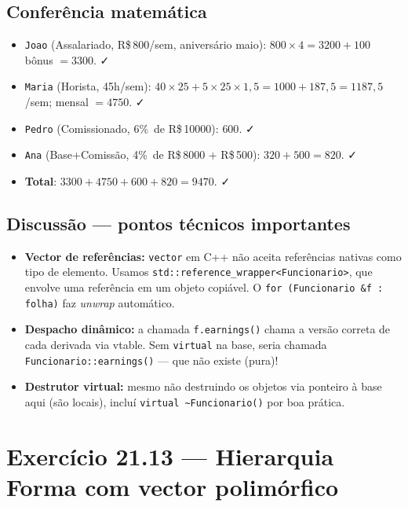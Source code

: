 \documentclass[11pt,a4paper]{article}
\begin{document}
\subsection*{Confer\^encia matem\'atica}

\begin{itemize}[leftmargin=*,itemsep=0pt]
  \item \texttt{Joao} (Assalariado, R\$\,800/sem, anivers\'ario maio): $800 \times 4 = 3200 + 100$ b\^onus $= 3300$. ✓
  \item \texttt{Maria} (Horista, 45h/sem): $40 \times 25 + 5 \times 25 \times 1{,}5 = 1000 + 187{,}5 = 1187{,}5$/sem; mensal $= 4750$. ✓
  \item \texttt{Pedro} (Comissionado, 6\%\ de R\$\,10000): $600$. ✓
  \item \texttt{Ana} (Base+Comiss\~ao, 4\%\ de R\$\,8000 + R\$\,500): $320 + 500 = 820$. ✓
  \item \textbf{Total}: $3300 + 4750 + 600 + 820 = 9470$. ✓
\end{itemize}

\subsection*{Discuss\~ao --- pontos t\'ecnicos importantes}

\begin{itemize}[leftmargin=*]
  \item \textbf{Vector de refer\^encias:} \texttt{vector} em C++ n\~ao aceita refer\^encias nativas como tipo de elemento. Usamos \texttt{std::reference\_wrapper<Funcionario>}, que envolve uma refer\^encia em um objeto copi\'avel. O \texttt{for (Funcionario \&f : folha)} faz \emph{unwrap} autom\'atico.
  \item \textbf{Despacho din\^amico:} a chamada \texttt{f.earnings()} chama a vers\~ao correta de cada derivada via vtable. Sem \texttt{virtual} na base, seria chamada \texttt{Funcionario::earnings()} --- que n\~ao existe (pura)!
  \item \textbf{Destrutor virtual:} mesmo n\~ao destruindo os objetos via ponteiro \`a base aqui (s\~ao locais), inclu\'i \texttt{virtual \~{}Funcionario()} por boa pr\'atica.
\end{itemize}

\newpage
\section{Exerc\'icio 21.13 --- Hierarquia Forma com vector polim\'orfico}
\end{document}
